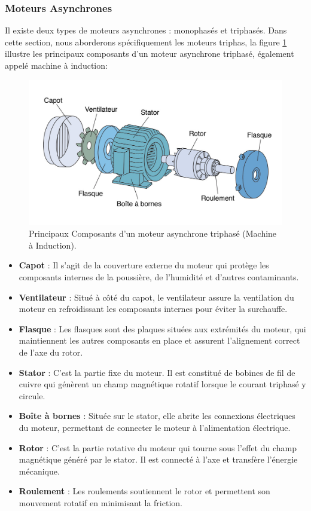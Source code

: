 \subsubsection{Moteurs Asynchrones}

Il existe deux types de moteurs asynchrones : monophasés et triphasés. Dans
cette section, nous aborderons spécifiquement les moteurs triphas, la figure
\ref{fig:moteur-asynchrone} illustre les principaux composants d'un moteur
asynchrone triphasé, également appelé machine à induction:

\begin{figure}[hbt!]
	\centering
	\includegraphics[width=12cm]{images_pfe/motor.jpg}
	\caption{
		Principaux Composants d'un moteur asynchrone triphasé (Machine à Induction).}
	\label{fig:moteur-asynchrone}
\end{figure}
\FloatBarrier

\begin{itemize}
	\item \textbf{Capot} : Il s'agit de la couverture externe du moteur qui protège les composants internes de la poussière, de l'humidité et d'autres contaminants.
	\item \textbf{Ventilateur} : Situé à côté du capot, le ventilateur assure la ventilation du moteur en refroidissant les composants internes pour éviter la surchauffe.
	\item \textbf{Flasque} : Les flasques sont des plaques situées aux extrémités du moteur, qui maintiennent les autres composants en place et assurent l'alignement correct de l'axe du rotor.
	\item \textbf{Stator} : C'est la partie fixe du moteur. Il est constitué de bobines de fil de cuivre qui génèrent un champ magnétique rotatif lorsque le courant triphasé y circule.
	\item \textbf{Boîte à bornes} : Située sur le stator, elle abrite les connexions électriques du moteur, permettant de connecter le moteur à l'alimentation électrique.
	\item \textbf{Rotor} : C'est la partie rotative du moteur qui tourne sous l'effet du champ magnétique généré par le stator. Il est connecté à l'axe et transfère l'énergie mécanique.
	\item \textbf{Roulement} : Les roulements soutiennent le rotor et permettent son mouvement rotatif en minimisant la friction.
\end{itemize}

